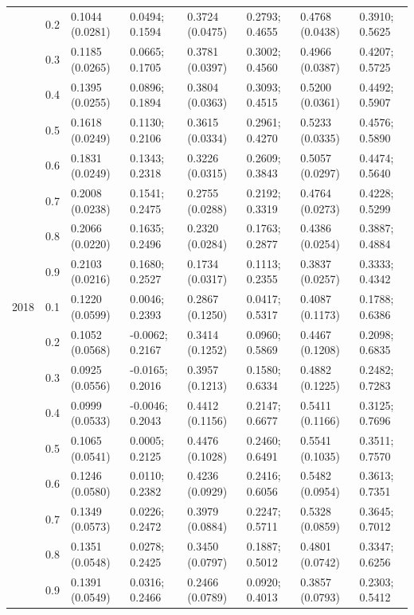 \begin{table}
{\begin{tabular}[t]{llllllll}
 & 0.2 & 0.1044 (0.0281) & 0.0494; 0.1594 & 0.3724 (0.0475) & 0.2793; 0.4655 & 0.4768 (0.0438) & 0.3910; 0.5625\\
 & 0.3 & 0.1185 (0.0265) & 0.0665; 0.1705 & 0.3781 (0.0397) & 0.3002; 0.4560 & 0.4966 (0.0387) & 0.4207; 0.5725\\
 & 0.4 & 0.1395 (0.0255) & 0.0896; 0.1894 & 0.3804 (0.0363) & 0.3093; 0.4515 & 0.5200 (0.0361) & 0.4492; 0.5907\\
 & 0.5 & 0.1618 (0.0249) & 0.1130; 0.2106 & 0.3615 (0.0334) & 0.2961; 0.4270 & 0.5233 (0.0335) & 0.4576; 0.5890\\
 & 0.6 & 0.1831 (0.0249) & 0.1343; 0.2318 & 0.3226 (0.0315) & 0.2609; 0.3843 & 0.5057 (0.0297) & 0.4474; 0.5640\\
 & 0.7 & 0.2008 (0.0238) & 0.1541; 0.2475 & 0.2755 (0.0288) & 0.2192; 0.3319 & 0.4764 (0.0273) & 0.4228; 0.5299\\
 & 0.8 & 0.2066 (0.0220) & 0.1635; 0.2496 & 0.2320 (0.0284) & 0.1763; 0.2877 & 0.4386 (0.0254) & 0.3887; 0.4884\\
 & 0.9 & 0.2103 (0.0216) & 0.1680; 0.2527 & 0.1734 (0.0317) & 0.1113; 0.2355 & 0.3837 (0.0257) & 0.3333; 0.4342\\
2018 & 0.1 & 0.1220 (0.0599) & 0.0046; 0.2393 & 0.2867 (0.1250) & 0.0417; 0.5317 & 0.4087 (0.1173) & 0.1788; 0.6386\\
 & 0.2 & 0.1052 (0.0568) & -0.0062; 0.2167 & 0.3414 (0.1252) & 0.0960; 0.5869 & 0.4467 (0.1208) & 0.2098; 0.6835\\
 & 0.3 & 0.0925 (0.0556) & -0.0165; 0.2016 & 0.3957 (0.1213) & 0.1580; 0.6334 & 0.4882 (0.1225) & 0.2482; 0.7283\\
 & 0.4 & 0.0999 (0.0533) & -0.0046; 0.2043 & 0.4412 (0.1156) & 0.2147; 0.6677 & 0.5411 (0.1166) & 0.3125; 0.7696\\
 & 0.5 & 0.1065 (0.0541) & 0.0005; 0.2125 & 0.4476 (0.1028) & 0.2460; 0.6491 & 0.5541 (0.1035) & 0.3511; 0.7570\\
 & 0.6 & 0.1246 (0.0580) & 0.0110; 0.2382 & 0.4236 (0.0929) & 0.2416; 0.6056 & 0.5482 (0.0954) & 0.3613; 0.7351\\
 & 0.7 & 0.1349 (0.0573) & 0.0226; 0.2472 & 0.3979 (0.0884) & 0.2247; 0.5711 & 0.5328 (0.0859) & 0.3645; 0.7012\\
 & 0.8 & 0.1351 (0.0548) & 0.0278; 0.2425 & 0.3450 (0.0797) & 0.1887; 0.5012 & 0.4801 (0.0742) & 0.3347; 0.6256\\
 & 0.9 & 0.1391 (0.0549) & 0.0316; 0.2466 & 0.2466 (0.0789) & 0.0920; 0.4013 & 0.3857 (0.0793) & 0.2303; 0.5412\\

\end{tabular}}
\end{table}
